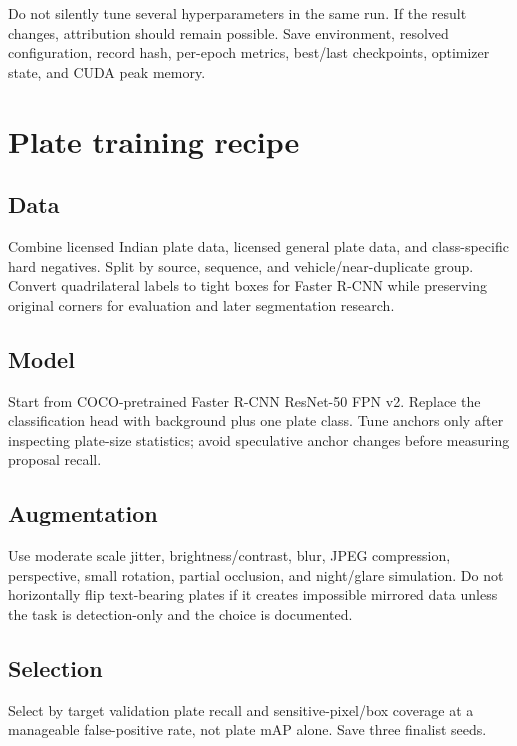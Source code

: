 Do not silently tune several hyperparameters in the same run. If the result changes, attribution should remain possible. Save environment, resolved configuration, record hash, per-epoch metrics, best/last checkpoints, optimizer state, and CUDA peak memory.

\section{Plate training recipe}

\subsection*{Data}

Combine licensed Indian plate data, licensed general plate data, and class-specific hard negatives. Split by source, sequence, and vehicle/near-duplicate group. Convert quadrilateral labels to tight boxes for Faster R-CNN while preserving original corners for evaluation and later segmentation research.

\subsection*{Model}

Start from COCO-pretrained Faster R-CNN ResNet-50 FPN v2. Replace the classification head with background plus one plate class. Tune anchors only after inspecting plate-size statistics; avoid speculative anchor changes before measuring proposal recall.

\subsection*{Augmentation}

Use moderate scale jitter, brightness/contrast, blur, JPEG compression, perspective, small rotation, partial occlusion, and night/glare simulation. Do not horizontally flip text-bearing plates if it creates impossible mirrored data unless the task is detection-only and the choice is documented.

\subsection*{Selection}

Select by target validation plate recall and sensitive-pixel/box coverage at a manageable false-positive rate, not plate mAP alone. Save three finalist seeds.

